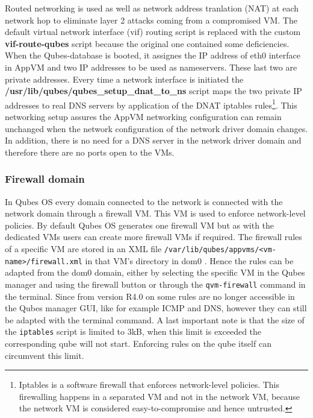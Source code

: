 \documentclass[runningheads,a4paper]{article}
\begin{document}
Routed networking is used as well as network address tranlation (NAT)
at each network hop to eliminate layer 2 attacks coming from a
compromised VM. The default virtual network interface (vif) routing
script is replaced with the custom \textbf{vif-route-qubes} script
because the original one contained some deficiencies. When the
Qubes-database is booted, it assignes the IP address of eth0 interface
in AppVM and two IP addresses to be used as nameservers. These last
two are private addresses. Every time a network interface is
initiated the \textbf{/usr/lib/qubes/qubes\_setup\_dnat\_to\_ns} script
maps the two private IP addresses to real DNS servers by application
of the DNAT iptables rules\footnote{Iptables is a software firewall that
enforces network-level policies. This firewalling happens in a
separated VM and not in the network VM, because the network VM is
considered easy-to-compromise and hence untrusted.}. This networking
setup assures the AppVM networking configuration can remain unchanged
when the network configuration of the network driver domain
changes. In addition, there is no need for a DNS server in the network
driver domain and therefore there are no ports open to the VMs.

\subsubsection{Firewall domain}

In Qubes OS every domain connected to the network is connected with
the network domain through a firewall VM. This VM is used to enforce
network-level policies. By default Qubes OS generates one firewall VM
but as with the dedicated VMs users can create more firewall VMs if
required. The firewall rules of a specific VM are stored in an XML
file \texttt{/var/lib/qubes/appvms/<vm-name>/firewall.xml} in that VM's
directory in dom0 . Hence the rules can be adapted from the dom0
domain, either by selecting the specific VM in the Qubes manager and
using the firewall button or through the \texttt{qvm-firewall} command
in the terminal. Since from version R4.0 on some rules are no longer
accessible in the Qubes manager GUI, like for example ICMP and DNS,
however they can still be adapted with the terminal command. A last
important note is that the size of the \texttt{iptables} script is
limited to 3kB, when this limit is exceeded the corresponding qube will
not start. Enforcing rules on the qube itself can circumvent this
limit.
\end{document}

